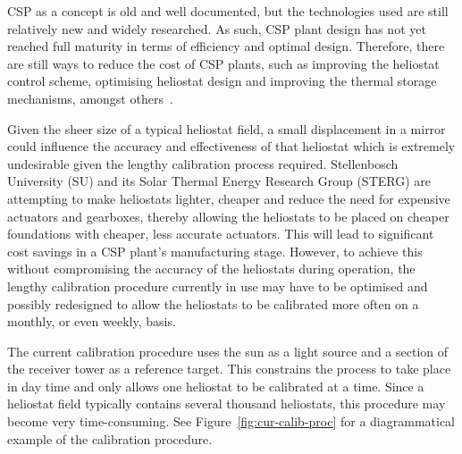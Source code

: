 CSP as a concept is old and well documented, but the technologies used are still relatively new and widely researched. As such, CSP plant design has not yet reached full maturity in terms of efficiency and optimal design. Therefore, there are still ways to reduce the cost of CSP plants, such as improving the heliostat control scheme, optimising heliostat design and improving the thermal storage mechanisms, amongst others~\citep{irena-cost_reduction}.  

Given the sheer size of a typical heliostat field, a small displacement in a mirror could influence the accuracy and effectiveness of that heliostat which is extremely undesirable given the lengthy calibration process required. Stellenbosch University (SU) and its Solar Thermal Energy Research Group (STERG) are attempting to make heliostats lighter, cheaper and reduce the need for expensive actuators and gearboxes, thereby allowing the heliostats to be placed on cheaper foundations with cheaper, less accurate actuators. This will lead to significant cost savings in a CSP plant's manufacturing stage. However, to achieve this without compromising the accuracy of the heliostats during operation, the lengthy calibration procedure currently in use may have to be optimised and possibly redesigned to allow the heliostats to be calibrated more often on a monthly, or even weekly, basis.

The current calibration procedure uses the sun as a light source and a section of the receiver tower as a reference target. This constrains the process to take place in day time and only allows one heliostat to be calibrated at a time. Since a heliostat field typically contains several thousand heliostats, this procedure may become very time-consuming. See Figure~\ref{fig:cur-calib-proc} for a diagrammatical example of the calibration procedure.

